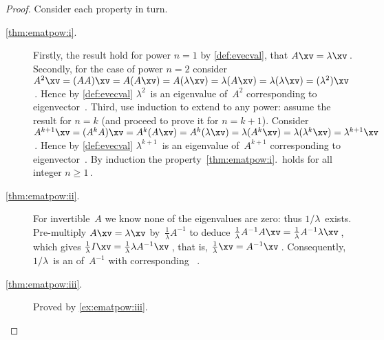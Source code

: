 \begin{proof} 
Consider each property in turn.
\begin{description}
\item[\ref{thm:ematpow:i}.]  
Firstly, the result hold for power \(n=1\) by \autoref{def:evecval}, that \(A\xv=\lambda\xv\)\,.
Secondly, for the case of power \(n=2\)  consider \(A^2\xv=(AA)\xv=A(A\xv)=A(\lambda\xv)=\lambda(A\xv)=\lambda(\lambda\xv)=(\lambda^2)\xv\)\,.  
Hence by \autoref{def:evecval} \(\lambda^2\)~is an eigenvalue of~\(A^2\) corresponding to eigenvector~\xv.
Third, use induction to extend to any power: assume the result for \(n=k\) (and proceed to prove it for \(n=k+1\)).
Consider \(A^{k+1}\xv=(A^kA)\xv=A^k(A\xv)=A^k(\lambda\xv)=\lambda(A^k\xv)=\lambda(\lambda^k\xv)=\lambda^{k+1}\xv\)\,.
Hence by \autoref{def:evecval} \(\lambda^{k+1}\)~is an eigenvalue of~\(A^{k+1}\) corresponding to eigenvector~\xv.
By induction the property~\ref{thm:ematpow:i}.\ holds for all integer \(n\geq1\)\,.

\item[\ref{thm:ematpow:ii}.]  
For invertible~\(A\) we know none of the eigenvalues are zero: thus \(1/\lambda\)~exists.
Pre-multiply \(A\xv=\lambda\xv\) by~\(\frac1\lambda A^{-1}\) to deduce
\(\frac1\lambda A^{-1}A\xv=\frac1\lambda A^{-1}\lambda\xv\)\,, which gives \(\frac1\lambda I\xv=\frac1\lambda \lambda A^{-1}\xv\)\,, that is, \(\frac1\lambda\xv= A^{-1}\xv\)\,.  
Consequently, \(1/\lambda\)~is an  of~\(A^{-1}\) with corresponding ~\xv.

\item[\ref{thm:ematpow:iii}.] Proved by \autoref{ex:ematpow:iii}.  
\end{description}
\end{proof}




